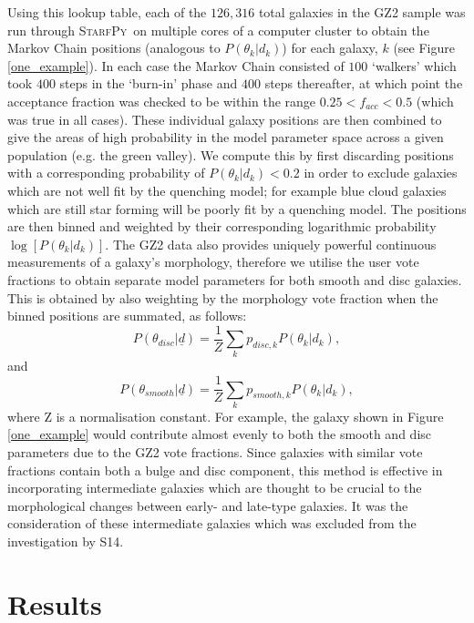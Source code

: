 \documentclass[useAMS,usenatbib]{mn2e}
\def\starfpy {\textsc{StarfPy}}
\begin{document}
{Using this lookup table, each of the $126,316$ total galaxies in the GZ2 sample was run through \starfpy ~on multiple cores of a computer cluster to obtain the Markov Chain positions (analogous to $P(\theta_k|d_k)$) for each galaxy, $k$ (see Figure \ref{one_example}). In each case the Markov Chain consisted of $100$ `walkers' which took $400$ steps in the `burn-in' phase and $400$ steps thereafter, at which point the acceptance fraction was checked to be within the range $0.25 < f_{acc} < 0.5$ (which was true in all cases). These individual galaxy positions are then combined to give the areas of high probability in the model parameter space across a given population (e.g. the green valley). We compute this by first discarding positions with a corresponding probability of $P(\theta_k|d_k) < 0.2$ in order to exclude galaxies which are not well fit by the quenching model; for example blue cloud galaxies which are still star forming will be poorly fit by a quenching model. The positions are then binned and weighted by their corresponding logarithmic probability $\log [P(\theta_k|d_k)]$. The GZ2 data also provides uniquely powerful continuous measurements of a galaxy's morphology, therefore we utilise the user vote fractions to obtain separate model parameters for both smooth and disc galaxies. This is obtained by also weighting by the morphology vote fraction when the binned positions are summated, as follows:
\begin{equation}\label{sum}
P(\theta_{disc} | \underline{d}) = \frac{1}{Z} \sum_k p_{disc, k} P(\theta_k|d_k),
\end{equation}
and
\begin{equation}\label{sum2}
P(\theta_{smooth} | \underline{d}) = \frac{1}{Z} \sum_k p_{smooth, k} P(\theta_k|d_k), 
\end{equation}
where Z is a normalisation constant. For example, the galaxy shown in Figure \ref{one_example} would contribute almost evenly to both the smooth and disc parameters due to the GZ2 vote fractions. Since galaxies with similar vote fractions contain both a bulge and disc component, this method is effective in incorporating intermediate galaxies which are thought to be crucial to the morphological changes between early- and late-type galaxies. It was the consideration of these intermediate galaxies which was excluded from the investigation by S14.}


\section{Results}\label{results}
\end{document}
